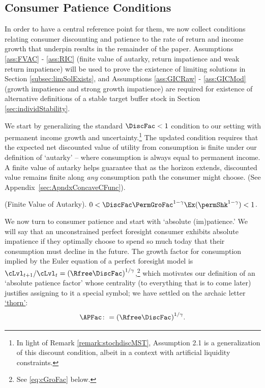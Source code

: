 \documentclass[BufferStockTheory]{subfiles}
\begin{document}
\hypertarget{GICTheorySetup}{}
\subsection{Consumer Patience Conditions}\label{subsec:GICTheorySetup}

In order to have a central reference point for them, we now collect conditions relating consumer discounting and patience to the rate of return and income growth that underpin results in the remainder of the paper.
Assumptions \ref{ass:FVAC} - \ref{ass:RIC}  (finite value of autarky, return impatience and weak return impatience) will be used to prove the existence of limiting solutions in Section \ref{subsec:limSolExists}, and Assumptions \ref{ass:GICRaw} - \ref{ass:GICMod} (growth impatience and strong growth impatience) are required for existence of alternative definitions of a stable target buffer stock in Section \ref{sec:individStability}.


We start by generalizing the standard $\DiscFac<1$ condition to our setting with permanent income growth and uncertainty.\footnote{In light of Remark \ref{remark:stochdiscMST}, \cite{mstIncFluct} Assumption 2.1 is a generalization of this discount condition, albeit in a context with artificial liquidity constraints.} The updated condition requires that the expected net discounted value of utility from consumption is finite under our definition of `autarky' -- where consumption is always equal to permanent income.
A finite value of autarky helps guarantee that as the horizon extends, discounted value remains finite along \textit{any} consumption path the consumer might choose.
(See Appendix~\ref{sec:ApndxConcaveCFunc}).



\hypertarget{FVAC}{}
\begin{assumL}\label{ass:FVAC}(Finite Value of Autarky). 
%
$0 < \DiscFac \PermGroFac^{1-\CRRA}\Ex(\permShk^{1-\CRRA}) < 1 $.
%
\end{assumL}


We now turn to consumer patience and start with `absolute (im)patience.'
We will say that an unconstrained perfect foresight consumer exhibits absolute impatience if they optimally choose to spend so much today that their consumption must decline in the future.
The growth factor for consumption implied by the Euler equation of a perfect foresight model is $\cLvl_{t+1}/\cLvl_{t} = {(\Rfree\DiscFac)}^{1/\CRRA}$,\footnote{See \eqref{eq:cGroFac} below.} which motivates our definition of an `absolute patience factor' whose centrality (to everything that is to come later) justifies assigning to it a special symbol; we have settled on the archaic letter \href{https://en.wikipedia.org/wiki/Thorn_(letter)}{`thorn'}:
\hypertarget{APFac}{}
\begin{equation}\label{eq:APFac}
    \APFac \colon= {(\Rfree\DiscFac)}^{1/\CRRA}.
\end{equation}
\end{document}
